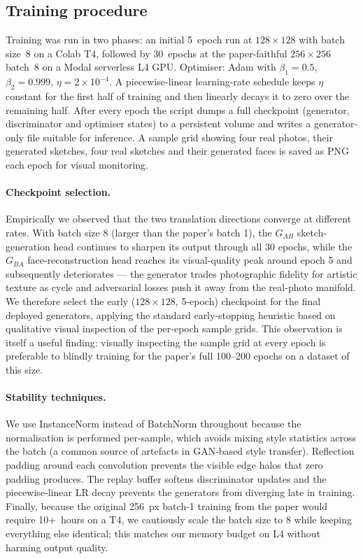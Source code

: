 \documentclass[runningheads]{llncs}
\begin{document}
\subsection{Training procedure}

Training was run in two phases: an initial 5~epoch run at $128\times
128$ with batch size~8 on a Colab T4, followed by 30~epochs at the
paper-faithful $256\times 256$ batch~8 on a Modal serverless L4 GPU.
Optimiser: Adam with $\beta_1=0.5$, $\beta_2=0.999$,
$\eta=2\!\times\!10^{-4}$. A piecewise-linear learning-rate schedule
keeps $\eta$ constant for the first half of training and then linearly
decays it to zero over the remaining half. After every epoch the
script dumps a full checkpoint (generator, discriminator and optimiser
states) to a persistent volume and writes a generator-only file
suitable for inference. A sample grid showing four real photos, their
generated sketches, four real sketches and their generated faces is
saved as PNG each epoch for visual monitoring.

\paragraph{Checkpoint selection.} Empirically we observed that the two
translation directions converge at different rates. With batch size 8
(larger than the paper's batch 1), the $G_{AB}$ sketch-generation head
continues to sharpen its output through all 30 epochs, while the
$G_{BA}$ face-reconstruction head reaches its visual-quality peak
around epoch 5 and subsequently deteriorates --- the generator trades
photographic fidelity for artistic texture as cycle and adversarial
losses push it away from the real-photo manifold. We therefore select
the early ($128\times 128$, 5-epoch) checkpoint for the final
deployed generators, applying the standard early-stopping heuristic
based on qualitative visual inspection of the per-epoch sample grids.
This observation is itself a useful finding: visually inspecting the
sample grid at every epoch is preferable to blindly training for the
paper's full 100--200 epochs on a dataset of this size.

\paragraph{Stability techniques.} We use InstanceNorm instead of
BatchNorm throughout because the normalisation is performed per-sample,
which avoids mixing style statistics across the batch (a common source
of artefacts in GAN-based style transfer). Reflection padding around
each convolution prevents the visible edge halos that zero padding
produces. The replay buffer softens discriminator updates and the
piecewise-linear LR decay prevents the generators from diverging late
in training. Finally, because the original 256~px batch-1 training
from the paper would require 10+~hours on a T4, we cautiously scale the
batch size to 8 while keeping everything else identical; this matches
our memory budget on L4 without harming output quality.
\end{document}
